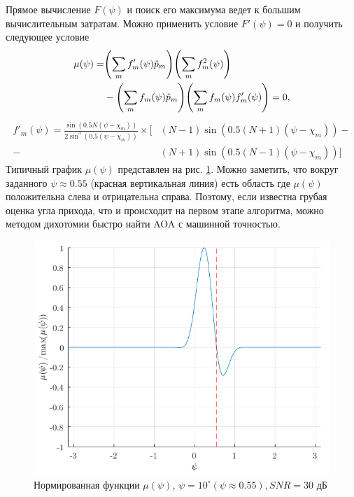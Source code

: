 Прямое вычисление $F(\psi)$ и поиск его максимума ведет к большим вычислительным затратам. Можно применить условие $F'(\psi) =0$ и получить следующее условие
\begin{equation}
    \label{eq:4.31}
    \begin{aligned}
        \mu(\psi) = &
        \qty(\sum\limits_m f'_m(\psi) \hat p_m) \qty(\sum\limits_m f^2_m(\psi))                              \\
                    & - \qty(\sum\limits_m f_m(\psi)\hat p_m) \qty(\sum\limits_m f_m (\psi) f'_m(\psi)) = 0,
    \end{aligned}
\end{equation}
\begin{equation}
    \label{eq:4.32}
    \begin{aligned}
        f'_m(\psi) = \frac{\sin(0.5N (\psi - \chi_m))}{2\sin^3(0.5(\psi - \chi_m))} \times
        \big[
          & (N-1)\sin(0.5(N+1) (\psi - \chi_m)) - \\
        - & (N+1) \sin(0.5(N-1)(\psi - \chi_m))
            \big]
    \end{aligned}
\end{equation}
Типичный график $\mu(\psi)$ представлен на рис. \ref{fig:4.12}. Можно заметить, что вокруг заданного $\psi \approx 0.55$ (красная вертикальная линия) есть область где
$\mu(\psi)$ положительна слева и отрицательна справа. Поэтому, если известна грубая оценка угла прихода,
что и происходит на первом этапе алгоритма,
можно методом дихотомии быстро найти AOA с машинной точностью.
\begin{figure}[h!]
    \centering
    \includegraphics[width=0.5\linewidth]{figs/fig4.11}
    \caption{Нормированная функции $\mu(\psi)$, $\psi=10^{\circ} (\psi \approx 0.55), SNR=30$ дБ}
    \label{fig:4.12}
\end{figure}

